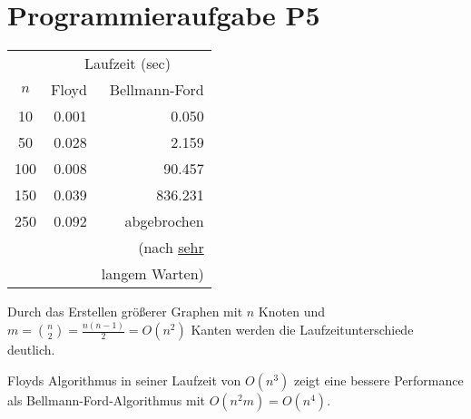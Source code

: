 \documentclass[11pt]{scrartcl} %
\begin{document}
\section*{Programmieraufgabe P5}
\begin{minipage}[h]{0.4\textwidth}
\begin{tabular}{c|r|r}
 & \multicolumn{2}{c}{Laufzeit (sec)}\\
$n$ & Floyd & Bellmann-Ford\\
\hline \hline
10 & 0.001 & 0.050\\
\hline
50 & 0.028 & 2.159 \\
\hline
100 & 0.008 & 90.457 \\
\hline
150 & 0.039 & 836.231 \\
\hline
250 & 0.092 & abgebrochen\\
& & \scriptsize{(nach \underline{sehr}}\\
& & \scriptsize{langem Warten)}\\
\hline
\end{tabular}
\end{minipage}
\begin{minipage}[h]{0.6\textwidth}
Durch das Erstellen größerer Graphen mit $n$ Knoten und $m=\binom{n}{2}=\frac{n(n-1)}{2}=O(n^2)$ Kanten werden die Laufzeitunterschiede deutlich.

Floyds Algorithmus in seiner Laufzeit von $O(n^3)$ zeigt eine bessere Performance als Bellmann-Ford-Algorithmus mit $O(n^2m)=O(n^4)$.
\end{minipage}
\end{document}

